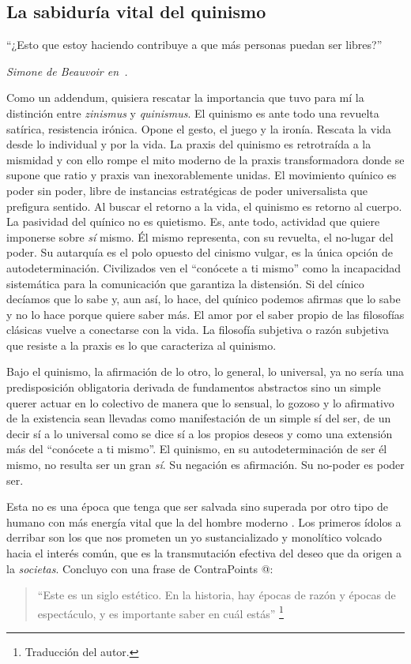 \subsection{La sabiduría vital del quinismo}
\label{la-sabiduría-vital-del-quinismo}

\epigraph{\enquote{¿Esto que estoy haciendo contribuye a que más personas puedan ser libres?}}{\emph{Simone de Beauvoir en~\autocite{Beauvoir1972}.}}

Como un addendum, quisiera rescatar la importancia que tuvo para mí la distinción entre \emph{zinismus} y \emph{quinismus}. El quinismo es ante todo una revuelta satírica, resistencia irónica. Opone el gesto, el juego y la ironía. Rescata la vida desde lo individual y por la vida. La praxis del quinismo es retrotraída a la mismidad y con ello rompe el mito moderno de la praxis transformadora donde se supone que ratio y praxis van inexorablemente unidas. El movimiento quínico es poder sin poder, libre de instancias estratégicas de poder universalista que prefigura sentido. Al buscar el retorno a la vida, el quinismo es retorno al cuerpo. La pasividad del quínico no es quietismo. Es, ante todo, actividad que quiere imponerse sobre \emph{sí} mismo. Él mismo representa, con su revuelta, el no-lugar del poder. Su autarquía es el polo opuesto del cinismo vulgar, es la única opción de autodeterminación. Civilizados ven el \enquote{conócete a ti mismo} como la incapacidad sistemática para la comunicación que garantiza la distensión. Si del cínico decíamos que lo sabe y, aun así, lo hace, del quínico podemos afirmas que lo sabe y no lo hace porque quiere saber más. El amor por el saber propio de las filosofías clásicas vuelve a conectarse con la vida. La filosofía subjetiva o razón subjetiva que resiste a la praxis es lo que caracteriza al quinismo.

Bajo el quinismo, la afirmación de lo otro, lo general, lo universal, ya no sería una predisposición obligatoria derivada de fundamentos abstractos sino un simple querer actuar en lo colectivo de manera que lo sensual, lo gozoso y lo afirmativo de la existencia sean llevadas como manifestación de un simple sí del ser, de un decir sí a lo universal como se dice sí a los propios deseos y como una extensión más del \enquote{conócete a ti mismo}. El quinismo, en su autodeterminación de ser él mismo, no resulta ser un gran \emph{sí}. Su negación es afirmación. Su no-poder es poder ser.

Esta no es una época que tenga que ser salvada sino superada por otro tipo de humano con más energía vital que la del hombre moderno \autocite{anonimoQuinismoImposibleAcerca2010}. Los primeros ídolos a derribar son los que nos prometen un yo sustancializado y monolítico volcado hacia el interés común, que es la transmutación efectiva del deseo que da origen a la \emph{societas}. Concluyo con una frase de ContraPoints @\autocite{openfutureTransgenderPopulistFighting2018}:

\begin{quote}
\enquote{Este es un siglo estético. En la historia, hay épocas de razón y épocas de espectáculo, y es importante saber en cuál estás} \footnote{Traducción del autor.}
\end{quote}